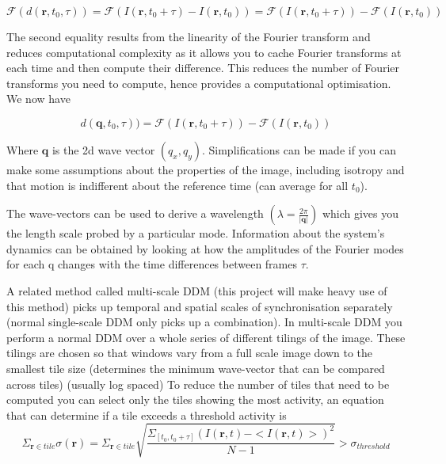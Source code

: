 \documentclass[11pt]{article}
\begin{document}
\begin{equation}
    \mathscr{F} (d(\textbf{r}, t_0, \tau) ) = \mathscr{F} (I(\mathbf{r}, t_0 + \tau) - I(\mathbf{r}, t_0)) = \mathscr{F}(I(\mathbf{r}, t_0 + \tau)) - \mathscr{F}(I(\mathbf{r}, t_0))
\end{equation}

The second equality results from the linearity of the Fourier transform and reduces computational complexity as it allows you to cache Fourier transforms at each time and then compute their difference.
This reduces the number of Fourier transforms you need to compute, hence provides a computational optimisation.\cite{ddm2}
We now have

\begin{equation}
    d(\textbf{q}, t_0, \tau) ) = \mathscr{F}(I(\mathbf{r}, t_0 + \tau)) - \mathscr{F}(I(\mathbf{r}, t_0))
\end{equation}

Where $\textbf{q}$ is the 2d wave vector $(q_x, q_y)$.
Simplifications can be made if you can make some assumptions about the properties of the image, including isotropy and that motion is indifferent about the reference time (can average for all $t_0$).\cite{ddm1}

The wave-vectors can be used to derive a wavelength $(\lambda = \frac{2\pi}{|\textbf{q}|})$ which gives you the length scale probed by a particular mode.
Information about the system's dynamics can be obtained by looking at how the amplitudes of the Fourier modes for each q changes with the time differences between frames $\tau$.\cite{ddm2}


A related method called multi-scale DDM (this project will make heavy use of this method) picks up temporal and spatial scales of synchronisation separately (normal single-scale DDM only picks up a combination).
In multi-scale DDM you perform a normal DDM over a whole series of different tilings of the image.\cite{ddm1}
These tilings are chosen so that windows vary from a full scale image down to the smallest tile size (determines the minimum wave-vector that can be compared across tiles) (usually log spaced)\cite{ddm1}
To reduce the number of tiles that need to be computed you can select only the tiles showing the most activity, an equation that can determine if a tile exceeds a threshold activity is
\begin{equation}
    \Sigma_{\textbf{r} \in tile} \sigma(\textbf{r}) = \Sigma_{\textbf{r} \in tile} \sqrt{\frac{\Sigma_{[t_0, t_0 + \tau]} (I(\mathbf{r}, t) - <I(\mathbf{r}, t)>)^2}{N - 1}} > \sigma_{threshold}
\end{equation}
\end{document}
